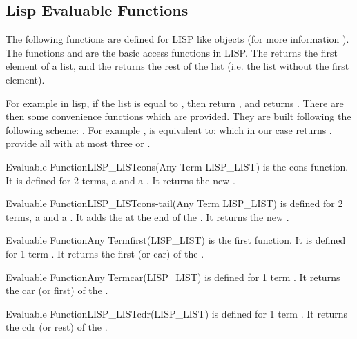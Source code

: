 \subsection{Lisp Evaluable Functions}

The following functions are defined for LISP like objects (for more information
). The functions  and 
are  the basic access functions in LISP. The  returns the first
element of a list, and the  returns the rest of the list (i.e. the
list without the first element).

For example in lisp, if the list  is equal to , then
 return , and  returns . There
are then some convenience functions which are provided. They are built following
the following scheme: . For example , is
equivalent to:  which in our case returns .
\COPRS{} provide all  with at most three  or .

\begin{typeefa}{Evaluable Function}{LISP\_LIST}{cons}{(Any Term LISP\_LIST)}
is the cons function. It is defined for 2 terms, a  and a
.  It returns the new .
\end{typeefa}

\begin{typeefa}{Evaluable Function}{LISP\_LIST}{cons-tail}{(Any Term LISP\_LIST)}
is defined for 2 terms, a  and a .  It adds the
 at the end of the .  It returns the new
.
\end{typeefa}

\begin{typeefa}{Evaluable Function}{Any Term}{first}{(LISP\_LIST)}
is the first function. It is defined for 1 term . It returns the
first (or car)  of the .
\end{typeefa}

\begin{typeefa}{Evaluable Function}{Any Term}{car}{(LISP\_LIST)}
is defined for 1 term . It returns the car (or first)  of
the .
\end{typeefa}

\begin{typeefa}{Evaluable Function}{LISP\_LIST}{cdr}{(LISP\_LIST)}
is defined for 1 term . It returns the cdr (or rest)  of
the .
\end{typeefa}

